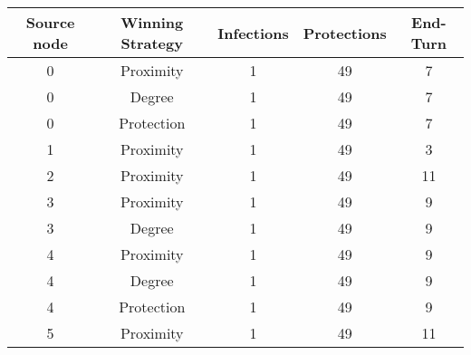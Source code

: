 \documentclass[results.tex]{subfiles}
\begin{document}
    \begin{center}
        \begin{tabular}{| c || c | c | c | c |}
            \hline
            {\bfseries Source node} & {\bfseries Winning Strategy} & {\bfseries Infections} & {\bfseries Protections}
            & {\bfseries End-Turn}
            \\  %
            \hline\hline
            0                       & Proximity                    & 1                      & 49                      & 7                    \\
            \hline
            0                       & Degree                       & 1                      & 49                      & 7                    \\
            \hline
            0                       & Protection                   & 1                      & 49                      & 7                    \\
            \hline
            1                       & Proximity                    & 1                      & 49                      & 3                    \\
            \hline
            2                       & Proximity                    & 1                      & 49                      & 11                   \\
            \hline
            3                       & Proximity                    & 1                      & 49                      & 9                    \\
            \hline
            3                       & Degree                       & 1                      & 49                      & 9                    \\
            \hline
            4                       & Proximity                    & 1                      & 49                      & 9                    \\
            \hline
            4                       & Degree                       & 1                      & 49                      & 9                    \\
            \hline
            4                       & Protection                   & 1                      & 49                      & 9                    \\
            \hline
            5                       & Proximity                    & 1                      & 49                      & 11                   \\

\end{tabular}
\end{center}
\end{document}
